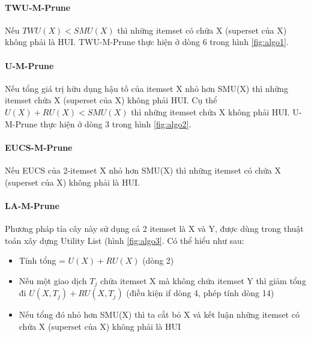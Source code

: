 
\paragraph{TWU-M-Prune} Nếu $TWU(X) < SMU(X)$ thì những itemset có chứa X (superset của X) không phải là HUI. TWU-M-Prune thực hiện ở dòng 6 trong hình \ref{fig:algo1}.

\paragraph{U-M-Prune} Nếu tổng giá trị hữu dụng hậu tố của itemset X nhỏ hơn SMU(X) thì những itemset chứa X (superset của X) không phải HUI. Cụ thể $U(X) + RU(X) < SMU(X)$ thì những itemset chứa X không phải HUI. U-M-Prune thực hiện ở dòng 3 trong hình \ref{fig:algo2}.

\paragraph{EUCS-M-Prune} Nếu EUCS của 2-itemset X nhỏ hơn SMU(X) thì những itemset có chứa X (superset của X) không phải là HUI. 

\paragraph{LA-M-Prune} Phương pháp tỉa cây này sử dụng cả 2 itemset là X và Y, được dùng trong thuật toán xây dựng Utility List (hình \ref{fig:algo3}. Có thể hiểu như sau: 

\begin{itemize}
  \item Tính tổng = $U(X) + RU(X)$ (dòng 2)
  \item Nếu một giao dịch $T_j$ chứa itemset X mà không chứa itemset Y thì giảm tổng đi $U(X, T_j) + RU(X, T_j)$ (điều kiện if dòng 4, phép tính dòng 14) 
  \item Nếu tổng đó nhỏ hơn SMU(X) thì ta cắt bỏ X và kết luận những itemset có chứa X (superset của X) không phải là HUI
\end{itemize}
